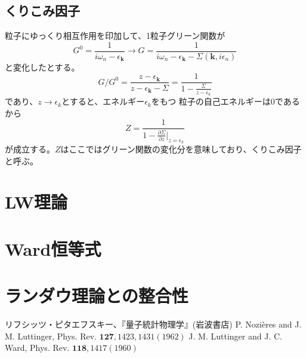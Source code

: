 \documentclass[11pt,a4j]{jarticle}
\begin{document}
\subsection{くりこみ因子}
粒子にゆっくり相互作用を印加して、1粒子グリーン関数が
\begin{equation}
    G^{0} = \frac{1}{i\omega_n - \epsilon_{\bm{k}}} \rightarrow G = \frac{1}{i\omega_n - \epsilon_{\bm{k}} - \Sigma(\bm{k},i\epsilon_n)}
\end{equation}
と変化したとする。
\begin{equation}
    G / G^{0} = \frac{z-\epsilon_{\bm{k}}}{z-\epsilon_{\bm{k}} - \Sigma} = \frac{1}{1 - \frac{\Sigma}{z - \epsilon_{k}}}
\end{equation}
であり、$z \rightarrow \epsilon_{k}$とすると、エネルギー$\epsilon_k$をもつ
粒子の自己エネルギーは$0$であるから
\begin{equation}
    Z = \frac{1}{1-\frac{\partial \Sigma}{\partial z}|_{z = \epsilon_{k}}}
\end{equation}
が成立する。$Z$はここではグリーン関数の変化分を意味しており、くりこみ因子と呼ぶ。
\section{LW理論}

\section{Ward恒等式}

\section{ランダウ理論との整合性}


\begin{thebibliography}{99}
     リフシッツ・ピタエフスキー、『量子統計物理学』(岩波書店)
    P. Nozières and J. M. Luttinger, Phys. Rev. $\bm{127}, 1423, 1431(1962)$
    J. M. Luttinger and J. C. Ward, Phys. Rev. $\bm{118}, 1417(1960)$
\end{thebibliography}
\end{document}
